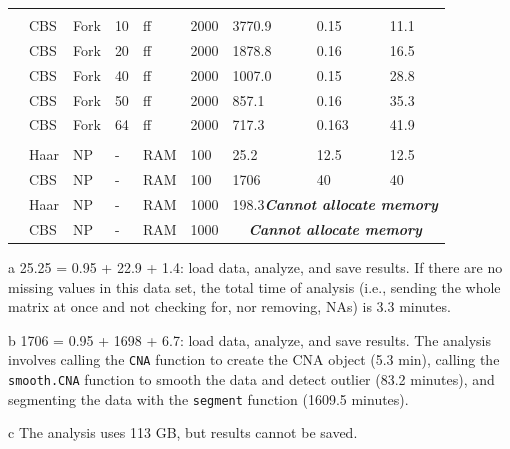 \documentclass[a4paper,11pt]{article}
\newcounter{magicrownumbers}
\newcommand\rownumber{\stepcounter{magicrownumbers}\arabic{magicrownumbers}}
\begin{document}
\begin{center}
\begin{threeparttable}
\begin{tabular}{lp{1.3cm}p{1.2cm}p{1.0cm}p{0.85cm}p{1.2cm}p{1.9cm}p{1.55cm}p{1.8cm}}
&&&&&&&\\
\rownumber&CBS & Fork &10  & ff & 2000 &3770.9 & 0.15 & 11.1 \\
\rownumber&CBS & Fork &20 & ff & 2000 & 1878.8 & 0.16 & 16.5 \\
\rownumber&CBS & Fork &40  & ff & 2000 & 1007.0 & 0.15 & 28.8 \\
\rownumber&CBS & Fork &50  & ff & 2000 & 857.1 & 0.16 & 35.3 \\
\rownumber&CBS & Fork & 64  & ff & 2000 & 717.3 & 0.163 & 41.9 \\

&&&&&&&\\


\rownumber&Haar & NP &-  &RAM  & 100 &  25.2\tnote{a}   & 12.5 & 12.5  \\
\rownumber&CBS     & NP &-  &RAM  & 100 & 1706\tnote{b}  &   40   &  40\\
\rownumber&Haar & NP &-  &RAM  & 1000 &
\multicolumn{3}{c}{198.3\tnote{c}\quad \textit{\textbf{Cannot allocate memory}}} \\
\rownumber&CBS     & NP &-  &RAM  & 1000 & \multicolumn{3}{c}{\textit{\qquad\textbf{Cannot allocate memory}}}\\

\hline
   
  \end{tabular}

  \begin{tablenotes}
    {\footnotesize

     \item[a] 25.25 = 0.95 + 22.9 + 1.4: load data, analyze, and save
       results. %
      If there are no missing values in this data set, the total time of
      analysis (i.e., sending the whole matrix at once and not checking
      for, nor removing, NAs) is 3.3 minutes.
    \item[b] 1706 =  0.95 + 1698 + 6.7: load data, analyze, and save results. The
      analysis involves calling the \texttt{CNA} function to create the CNA object
      (5.3 min), calling the \texttt{smooth.CNA} function to smooth the data
      and detect outlier (83.2 minutes), and segmenting the data with the
      \texttt{segment} function (1609.5 minutes).
    \item[c] The analysis uses 113 GB, but results cannot be saved.
      }
  \end{tablenotes}

\end{threeparttable}
\end{center}
\end{document}
